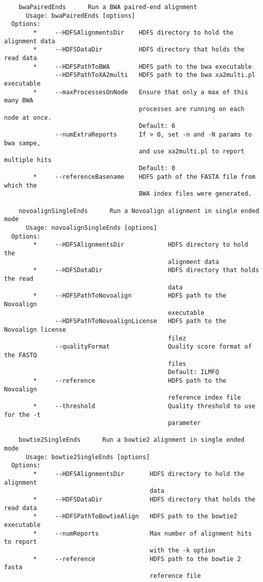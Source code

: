 \documentclass[11pt]{article}
\begin{document}
\begin{verbatim}
    bwaPairedEnds      Run a BWA paired-end alignment
      Usage: bwaPairedEnds [options]
  Options:
        *     --HDFSAlignmentsDir    HDFS directory to hold the alignment data
        *     --HDFSDataDir          HDFS directory that holds the read data
        *     --HDFSPathToBWA        HDFS path to the bwa executable
              --HDFSPathToXA2multi   HDFS path to the bwa xa2multi.pl executable
        *     --maxProcessesOnNode   Ensure that only a max of this many BWA
                                     processes are running on each node at once.
                                     Default: 6
              --numExtraReports      If > 0, set -n and -N params to bwa sampe,
                                     and use xa2multi.pl to report multiple hits
                                     Default: 0
        *     --referenceBasename    HDFS path of the FASTA file from which the
                                     BWA index files were generated.

    novoalignSingleEnds      Run a Novoalign alignment in single ended mode
      Usage: novoalignSingleEnds [options]
  Options:
        *     --HDFSAlignmentsDir            HDFS directory to hold the
                                             alignment data
        *     --HDFSDataDir                  HDFS directory that holds the read
                                             data
        *     --HDFSPathToNovoalign          HDFS path to the Novoalign
                                             executable
              --HDFSPathToNovoalignLicense   HDFS path to the Novoalign license
                                             filez
              --qualityFormat                Quality score format of the FASTQ
                                             files
                                             Default: ILMFQ
        *     --reference                    HDFS path to the Novoalign
                                             reference index file
        *     --threshold                    Quality threshold to use for the -t
                                             parameter

    bowtie2SingleEnds      Run a bowtie2 alignment in single ended mode
      Usage: bowtie2SingleEnds [options]
  Options:
        *     --HDFSAlignmentsDir       HDFS directory to hold the alignment
                                        data
        *     --HDFSDataDir             HDFS directory that holds the read data
        *     --HDFSPathToBowtieAlign   HDFS path to the bowtie2 executable
        *     --numReports              Max number of alignment hits to report
                                        with the -k option
        *     --reference               HDFS path to the bowtie 2 fasta
                                        reference file


\end{verbatim}
\end{document}
